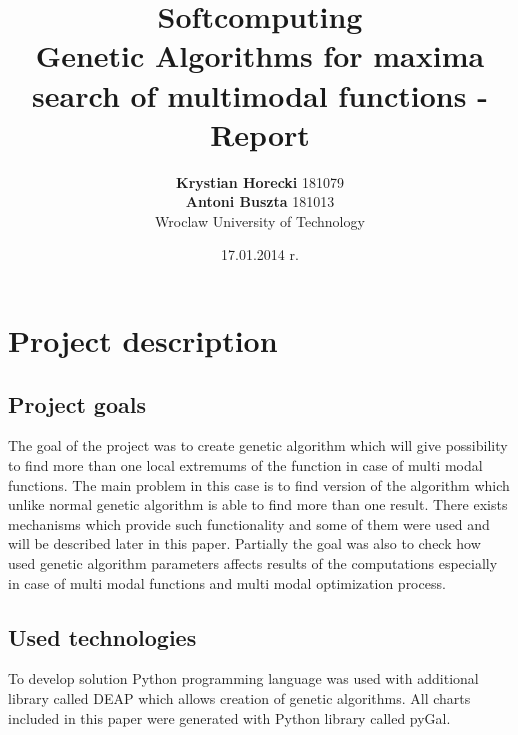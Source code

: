 \documentclass[a4paper]{article}
\title{Softcomputing \\ Genetic Algorithms for maxima search of multimodal functions - Report}
\author{\textbf{Krystian Horecki} 181079 \\ 
	\textbf{Antoni Buszta} 181013 \\
	Wroclaw University of Technology}
\date{17.01.2014 r.}
\begin{document}
\maketitle
\newpage
\tableofcontents
\onehalfspace

\section{Project description}
\subsection{Project goals} 
The goal of the project was to create genetic algorithm which will give possibility to find more than one local extremums of the function in case of multi modal functions. 
The main problem in this case is to find version of the algorithm which unlike normal genetic algorithm is able to find more than one result. There exists mechanisms which 
provide such functionality and some of them were used and will be described later in this paper.
Partially the goal was also to check how used genetic algorithm parameters affects results of the computations especially in case of multi modal functions and multi modal optimization process.
\subsection{Used technologies}
To develop solution Python programming language was used with additional library called DEAP\cite{deap} which allows creation of genetic algorithms.
All charts included in this paper were generated with Python library called pyGal\cite{pyGal}. 
\end{document}
